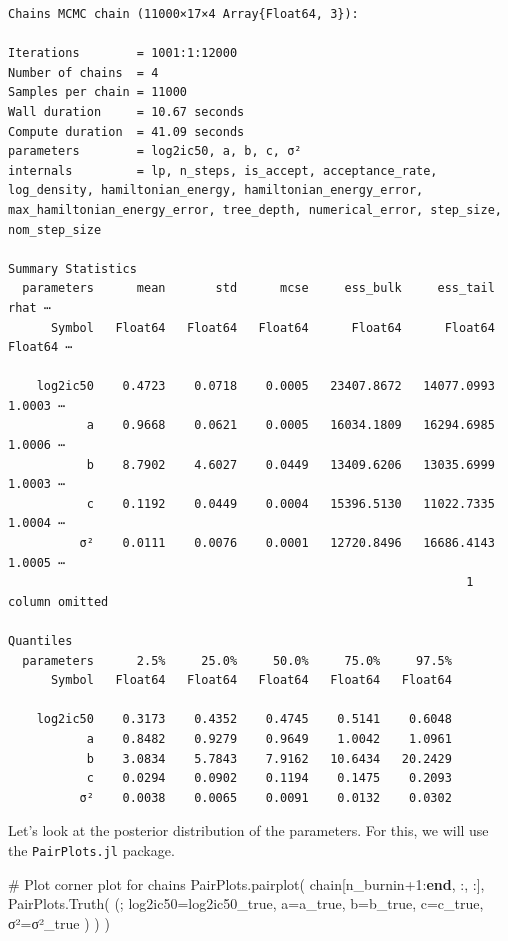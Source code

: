 \documentclass[
]{scrartcl}
\newenvironment{Shaded}{\begin{snugshade}}{\end{snugshade}}
\newcommand{\CommentTok}[1]{\textcolor[rgb]{0.37,0.37,0.37}{#1}}
\newcommand{\FloatTok}[1]{\textcolor[rgb]{0.68,0.00,0.00}{#1}}
\newcommand{\FunctionTok}[1]{\textcolor[rgb]{0.28,0.35,0.67}{#1}}
\newcommand{\KeywordTok}[1]{\textcolor[rgb]{0.00,0.23,0.31}{\textbf{#1}}}
\newcommand{\NormalTok}[1]{\textcolor[rgb]{0.00,0.23,0.31}{#1}}
\newcommand{\OperatorTok}[1]{\textcolor[rgb]{0.37,0.37,0.37}{#1}}
\begin{document}
\begin{verbatim}
Chains MCMC chain (11000×17×4 Array{Float64, 3}):

Iterations        = 1001:1:12000
Number of chains  = 4
Samples per chain = 11000
Wall duration     = 10.67 seconds
Compute duration  = 41.09 seconds
parameters        = log2ic50, a, b, c, σ²
internals         = lp, n_steps, is_accept, acceptance_rate, log_density, hamiltonian_energy, hamiltonian_energy_error, max_hamiltonian_energy_error, tree_depth, numerical_error, step_size, nom_step_size

Summary Statistics
  parameters      mean       std      mcse     ess_bulk     ess_tail      rhat ⋯
      Symbol   Float64   Float64   Float64      Float64      Float64   Float64 ⋯

    log2ic50    0.4723    0.0718    0.0005   23407.8672   14077.0993    1.0003 ⋯
           a    0.9668    0.0621    0.0005   16034.1809   16294.6985    1.0006 ⋯
           b    8.7902    4.6027    0.0449   13409.6206   13035.6999    1.0003 ⋯
           c    0.1192    0.0449    0.0004   15396.5130   11022.7335    1.0004 ⋯
          σ²    0.0111    0.0076    0.0001   12720.8496   16686.4143    1.0005 ⋯
                                                                1 column omitted

Quantiles
  parameters      2.5%     25.0%     50.0%     75.0%     97.5%
      Symbol   Float64   Float64   Float64   Float64   Float64

    log2ic50    0.3173    0.4352    0.4745    0.5141    0.6048
           a    0.8482    0.9279    0.9649    1.0042    1.0961
           b    3.0834    5.7843    7.9162   10.6434   20.2429
           c    0.0294    0.0902    0.1194    0.1475    0.2093
          σ²    0.0038    0.0065    0.0091    0.0132    0.0302
\end{verbatim}

Let's look at the posterior distribution of the parameters. For this, we
will use the \texttt{PairPlots.jl} package.

\begin{Shaded}
\begin{Highlighting}[]
\CommentTok{\# Plot corner plot for chains}
\NormalTok{PairPlots.}\FunctionTok{pairplot}\NormalTok{(}
\NormalTok{    chain[n\_burnin}\OperatorTok{+}\FloatTok{1}\OperatorTok{:}\KeywordTok{end}\NormalTok{, }\OperatorTok{:}\NormalTok{, }\OperatorTok{:}\NormalTok{],}
\NormalTok{    PairPlots.}\FunctionTok{Truth}\NormalTok{(}
\NormalTok{        (;}
\NormalTok{        log2ic50}\OperatorTok{=}\NormalTok{log2ic50\_true,}
\NormalTok{        a}\OperatorTok{=}\NormalTok{a\_true,}
\NormalTok{        b}\OperatorTok{=}\NormalTok{b\_true,}
\NormalTok{        c}\OperatorTok{=}\NormalTok{c\_true,}
\NormalTok{        σ²}\OperatorTok{=}\NormalTok{σ²\_true}
\NormalTok{    )}
\NormalTok{    )}
\NormalTok{)}
\end{Highlighting}
\end{Shaded}
\end{document}
